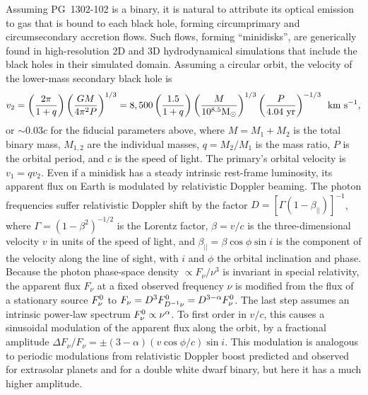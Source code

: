 Assuming PG~1302-102 is a binary, it is natural to attribute its
optical emission to gas that is bound to each black hole, forming
circumprimary and circumsecondary accretion flows. Such flows, forming
``minidisks'', are generically found in high-resolution 2D and 3D
hydrodynamical simulations that include the black holes in their
simulated
domain\cite{Hayasaki+2008,ShiKrolik:2012,Roedig:2012:Trqs,DHM:2013:MNRAS,NixonKing:Tear:2013,Farris:2014,Dunhill+2015,ShiKrolik:2015}.
Assuming a circular orbit, the velocity of the lower-mass secondary
black hole is
\begin{equation}
\nonumber
v_2= \left(\frac{2\pi}{1+q}\right) \left(\frac{GM}{4\pi^2P}\right)^{1/3} 
=8,500 
\left(\frac{1.5}{1+q}\right) 
\left(\frac{M}{10^{8.5}{\rm M_\odot}}\right)^{1/3}
\left(\frac{P}{4.04~{\rm yr}}\right)^{-1/3} \,\,\, {\rm km~s^{-1}},
\end{equation}
or $\sim 0.03c$ for the fiducial parameters above, where $M=M_1+M_2$
is the total binary mass, $M_{1,2}$ are the individual masses,
$q=M_2/M_1$ is the mass ratio, $P$ is the orbital period, and $c$ is
the speed of light.  The primary's orbital velocity is $v_1=qv_2$.
Even if a minidisk has a steady intrinsic rest-frame luminosity, its
apparent flux on Earth is modulated by relativistic Doppler beaming.
The photon frequencies suffer relativistic Doppler shift by the factor
$D=[\Gamma(1-\beta_{||})]^{-1}$, where $\Gamma=(1-\beta^2)^{-1/2}$ is
the Lorentz factor, $\beta=v/c$ is the three-dimensional velocity $v$
in units of the speed of light, and $\beta_{||}=\beta\cos\phi\sin i$
is the component of the velocity along the line of sight, with $i$ and
$\phi$ the orbital inclination and phase.  Because the photon
phase-space density $\propto F_\nu / \nu^3$ is invariant in special
relativity, the apparent flux $F_\nu$ at a fixed observed frequency
$\nu$ is modified from the flux of a stationary source $F_\nu^{\rm 0}$
to $F_\nu =D^{3}F^{\rm 0}_{D^{-1}\nu}=D^{3-\alpha}F^{\rm 0}_{\nu}$.
The last step assumes an intrinsic power-law spectrum $F^{\rm
  0}_{\nu}\propto \nu^{\alpha}$.  To first order in $v/c$, this causes
a sinusoidal modulation of the apparent flux along the orbit, by a
fractional amplitude $\Delta F_\nu/F_\nu = \pm
(3-\alpha)(v\cos\phi/c)\sin i$.  This modulation is analogous to
periodic modulations from relativistic Doppler boost
predicted\cite{LoebGaudi2003} and observed for extrasolar
planets\cite{Kerkwijk+2010,MH2010} and for a double white dwarf
binary\cite{Shporer+2010}, but here it has a much higher amplitude.


